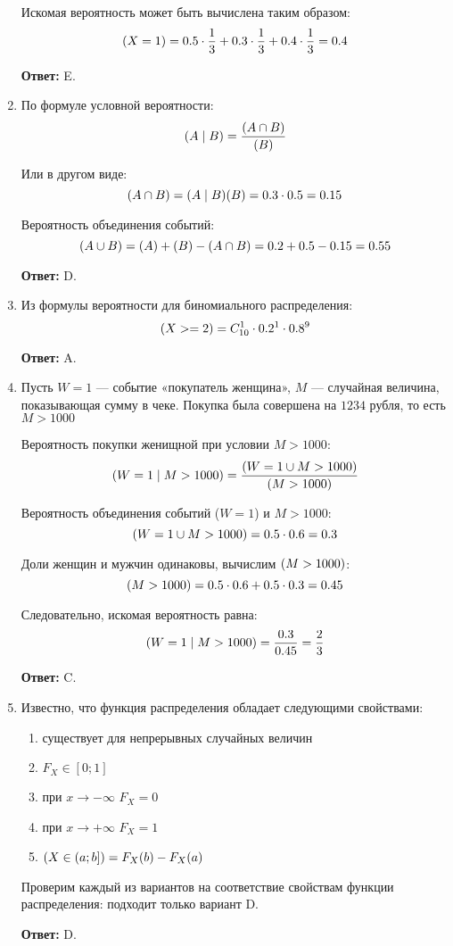 \documentclass[a4paper]{article} %
\let\P\relax
\DeclareMathOperator{\P}{\mathbb{P}}
\begin{document}
\begin{enumerate}
    Искомая вероятность может быть вычислена таким образом:
    \[
    \P(X=1) = 0.5\cdot\frac{1}{3} + 0.3\cdot\frac{1}{3} + 0.4\cdot\frac{1}{3} = 0.4
    \]
    
    \textbf{Ответ:} E.
    
    
    \item
    По формуле условной вероятности:
    \[
    \P(A\mid B) = \frac{\P(A\cap B)}{\P(B)}
    \]
    
    Или в другом виде:
    \[
    \P(A\cap B)=\P(A\mid B)\P(B) = 0.3 \cdot 0.5 = 0.15
    \]
    
    Вероятность объединения событий:
    \[
    \P(A\cup B) = \P(A) + \P(B) - \P(A\cap B) = 0.2+0.5-0.15 = 0.55
    \]
    
    \textbf{Ответ:} D.
    
    
    \item
    Из формулы вероятности для биномиального распределения:
    \[
    \P(X>=2) = C_{10}^1 \cdot0.2^1 \cdot 0.8^9
    \]
    
    \textbf{Ответ:} A.
    
    
    \item
    Пусть $W=1$ — событие «покупатель женщина», $M$ — случайная величина, показывающая сумму в чеке. 
    Покупка была совершена на $1234$ рубля, то есть $M>1000$
    
    Вероятность покупки женищной при условии $M>1000$:
    \[
    \P(W=1 \mid M>1000) = \frac{\P(W=1 \cup M>1000)}{\P(M>1000)}
    \]
    
    Вероятность объединения событий ($W=1$) и $M>1000$:
    \[
    \P(W=1 \cup M>1000) = 0.5 \cdot 0.6 = 0.3
    \]

    Доли женщин и мужчин одинаковы, вычислим $\P(M>1000)$:
    \[
    \P(M>1000) = 0.5 \cdot 0.6 + 0.5 \cdot 0.3 = 0.45
    \]
    
    Следовательно, искомая вероятность равна:
    \[
    \P(W=1 \mid M>1000) = \frac{0.3}{0.45} = \frac{2}{3}
    \]
    
    \textbf{Ответ:} C.
    
    
    \item
    Известно, что функция распределения обладает следующими свойствами:
    \begin{enumerate}
        \item существует для непрерывных случайных величин
        \item $F_X \in [0; 1]$
        \item при $x\rightarrow{-\infty}$ $F_X = 0$
        \item при $x\rightarrow{+\infty}$ $F_X = 1$
        \item $\P(X \in (a; b]) = F_X(b) - F_X(a)$
    \end{enumerate} 
    
    Проверим каждый из вариантов на соответствие свойствам функции распределения: подходит только вариант D.
    
    \textbf{Ответ:} D.
    
    
\end{enumerate}
\end{document}
